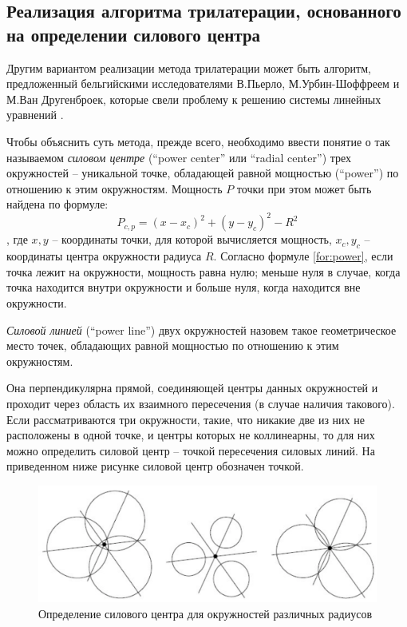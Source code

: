 \subsection{Реализация алгоритма трилатерации, основанного на определении силового центра}

Другим вариантом реализации метода трилатерации может быть алгоритм, предложенный бельгийскими исследователями В.Пьерло, М.Ур\-бин-\-Шоф\-фреем и М.Ван Другенброек, которые свели проблему к решению системы линейных уравнений \cite{pierlot2011new}.

Чтобы объяснить суть метода, прежде всего, необходимо ввести понятие о так называемом \textit{силовом центре} (“power center” или “radial center”) трех окружностей – уникальной точке, обладающей равной мощностью (“power”) по отношению к этим окружностям. Мощность $P$ точки при этом может быть найдена по формуле:
\begin{equation} \label{for:power}
    P_{c,p} = (x-x_c)^2 + (y-y_c)^2 - R^2
\end{equation}
, где ${x, y}$ – координаты точки, для которой вычисляется мощность, ${x_c, y_c}$ – координаты центра окружности радиуса $R$. Согласно формуле \ref{for:power}, если точка лежит на окружности, мощность равна нулю; меньше нуля в случае, когда точка находится внутри окружности и больше нуля, когда находится вне окружности.

\textit{Силовой линией }(“power line”) двух окружностей назовем такое геометрическое место точек, обладающих равной мощностью по отношению к этим окружностям. 

Она перпендикулярна прямой, соединяющей центры данных окружностей и проходит через область их взаимного пересечения (в случае наличия такового). Если рассматриваются три окружности, такие, что никакие две из них не расположены в одной точке, и центры которых не коллинеарны, то для них можно определить силовой центр – точкой пересечения силовых линий. На приведенном ниже рисунке силовой центр обозначен точкой.

\begin{figure}[ht]
    \centering
    \includegraphics[width=\textwidth]{img/powerCenters}
    \caption{Определение силового центра для окружностей различных радиусов}
\end{figure}

